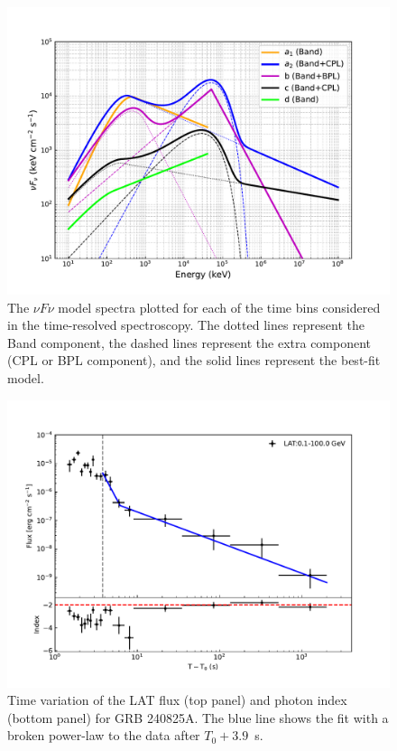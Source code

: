 \documentclass[twocolumn]{aastex631}
\begin{document}
\begin{figure}
\includegraphics[angle=0,scale=0.8]{sed_all.pdf}
\caption{The $\nu F \nu$ model spectra plotted for each of the time bins considered in the time-resolved spectroscopy.
The dotted lines represent the Band component, the dashed lines represent the extra component (CPL or BPL component), and the solid lines represent the best-fit model. 
}
\label{fig:spec_bin}
\end{figure}




\begin{figure}
\includegraphics[angle=0,scale=0.63]{lat_lc.pdf}
\caption{Time variation of the LAT flux (top panel) and photon index (bottom panel) for GRB 240825A. The blue line shows the fit with a broken power-law to the data after $T_0+3.9$~s. 
}
\label{lc_lat}
\end{figure}
\end{document}
